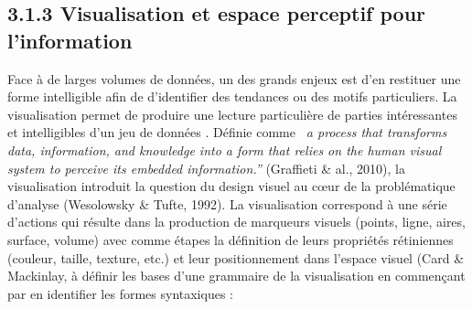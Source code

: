 \subsection[Visualisation et espace perceptif pour l{\textquoteright}information]{3.1.3 Visualisation et espace perceptif pour l{\textquoteright}information}
Face \`a de larges volumes de donn\'ees, un des grands enjeux est
d{\textquoteright}en restituer une forme intelligible afin de
d{\textquoteright}identifier des tendances ou des motifs particuliers.
La visualisation permet de produire une lecture particuli\`ere de
parties int\'eressantes et intelligibles d{\textquoteright}un jeu de
donn\'ees \cite{Cairo2013}. D\'efinie comme \textit{{\guillemotleft}~a
process that transforms data, information, and knowledge into a form
that relies on the human visual system to perceive its embedded
information.{\textquotedblright}} (Graffieti \& al., 2010), la
visualisation introduit la question du design visuel au c{\oe}ur de la
probl\'ematique d{\textquoteright}analyse (Wesolowsky \& Tufte, 1992).
La visualisation correspond \`a une s\'erie d{\textquoteright}actions
qui r\'esulte dans la production de marqueurs visuels (points, ligne,
aires, surface, volume) avec comme \'etapes la d\'efinition de leurs
propri\'et\'es r\'etiniennes (couleur, taille, texture, etc.) et leur
positionnement dans l{\textquoteright}espace visuel (Card \& Mackinlay,
 \`a d\'efinir les bases d{\textquoteright}une grammaire de la
visualisation en commen\c{c}ant par en identifier les formes
syntaxiques : 

